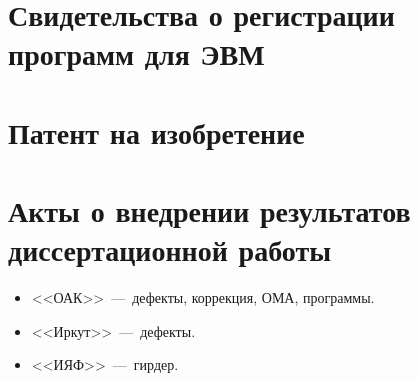 \chapter{Свидетельства о регистрации программ для ЭВМ} 






\chapter{Патент на изобретение} 



\chapter{Акты о внедрении результатов диссертационной работы} 

\begin{itemize}
	\item <<ОАК>>~---~дефекты, коррекция, ОМА, программы.
	\item <<Иркут>>~---~дефекты.
	\item <<ИЯФ>>~---~гирдер.
\end{itemize}